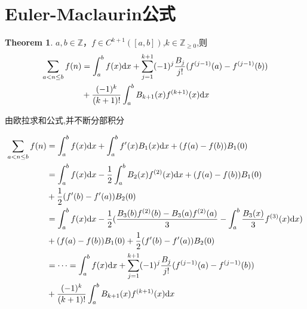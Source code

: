 \documentclass[a4paper,12pt]{ctexart}
\newenvironment{prooff}{{\noindent\it\textcolor{black}{Proof}:}\quad}{\par}
\theoremstyle{definition}
\newtheorem{theo}[defn]{Theorem}
\begin{document}
\section{Euler-Maclaurin公式}
\begin{theo}
$a,b\in \mathbb{Z}$，$f\in C^{k+1}([a,b])$,$k\in \mathbb{Z}_{\ge 0}$,则
\begin{align}
    \sum_{a<n\le b}f(n) & =\int _{a}^{b}f(x)\text{d}x+\sum_{j=1}^{k+1}(-1)^j \frac{B_j}{j!}(f^{(j-1)}(a)-f^{(j-1)}(b))\notag \\
                        & + \frac{(-1)^k}{(k+1)!} \int_a^b B_{k+1}(x)f^{(k+1)}(x)\text{d}x
\end{align}
\end{theo}
\begin{prooff}
    由欧拉求和公式,并不断分部积分

    \begin{align*}
        \sum_{a<n\le b}f(n) & =\int _{a}^{b}f(x)\text{d}x+\int_a^b f^{\prime}(x)B_1(x)\text{d}x +(f(a)-f(b))B_1(0)                                              \\
                            & =\int _{a}^{b}f(x)\text{d}x-\frac{1}{2}\int_a^bB_2(x)f^{(2)}(x)\text{d}x +(f(a)-f(b))B_1(0)                                       \\
                            & +\frac{1}{2}(f^{\prime}(b)-f^{\prime}(a))B_2(0)                                                                                   \\
                            & =\int _{a}^{b}f(x)\text{d}x-\frac{1}{2}(\frac{B_3(b)f^{(2)}(b)-B_3(a)f^{(2)}(a)}{3}-\int_a^b\frac{B_3(x)}{3}f^{(3)}(x)\text{d}x ) \\
                            & +(f(a)-f(b))B_1(0) +\frac{1}{2}(f^{\prime}(b)-f^{\prime}(a))B_2(0)                                                                \\
                            & =\dots =  \int _{a}^{b}f(x)\text{d}x+\sum_{j=1}^{k+1}(-1)^j \frac{B_j}{j!}(f^{(j-1)}(a)-f^{(j-1)}(b))\notag                       \\
                            & + \frac{(-1)^k}{(k+1)!} \int_a^b B_{k+1}(x)f^{(k+1)}(x)\text{d}x
    \end{align*}

\end{prooff}
\end{document}
